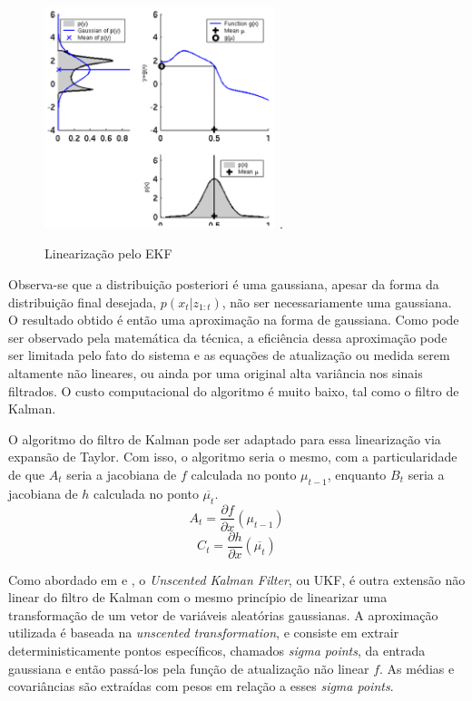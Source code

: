 \documentclass[a4paper,11pt]{article}
\begin{document}
\begin{figure}[!t]
\centering
\includegraphics[width = 0.6\textwidth]{LinearizacaoEKF.png}
\DeclareGraphicsExtensions.
\caption{Linearização pelo EKF}
\label{linearization}
\end{figure}

Observa-se que a distribuição posteriori é uma gaussiana, apesar da forma da distribuição final desejada, $p(x_t |z_{1:t})$, não ser necessariamente uma gaussiana. O resultado obtido é então uma aproximação na forma de gaussiana. Como pode ser observado pela matemática da técnica, a eficiência dessa aproximação pode ser limitada pelo fato do sistema e as equações de atualização ou medida serem altamente não lineares, ou ainda por uma original alta variância nos sinais filtrados. O custo computacional do algoritmo é muito baixo, tal como o filtro de Kalman.

O algoritmo do filtro de Kalman pode ser adaptado para essa linearização via expansão de Taylor. Com isso, o algoritmo seria o mesmo, com a particularidade de que $A_t$ seria a jacobiana de $f$ calculada no ponto $\mu_{t-1}$, enquanto $B_t$ seria a jacobiana de $h$ calculada no ponto $\overline{\mu_t}$.
\begin{equation}
    A_t = \frac{\partial f}{\partial x}(\mu_{t-1})
\end{equation}
\begin{equation}
    C_t = \frac{\partial h}{\partial x}(\overline{\mu_t})
\end{equation}

Como abordado em \cite{unscented_filtering} e \cite{ukf}, o \textit{Unscented Kalman Filter}, ou UKF, é outra extensão não linear do filtro de Kalman com o mesmo princípio de linearizar uma transformação de um vetor de variáveis aleatórias gaussianas. A aproximação utilizada é baseada na \textit{unscented transformation}, e consiste em extrair deterministicamente pontos específicos, chamados \textit{sigma points}, da entrada gaussiana e então passá-los pela função de atualização não linear $f$. As médias e covariâncias são extraídas com pesos em relação a esses \textit{sigma points}.
\end{document}
